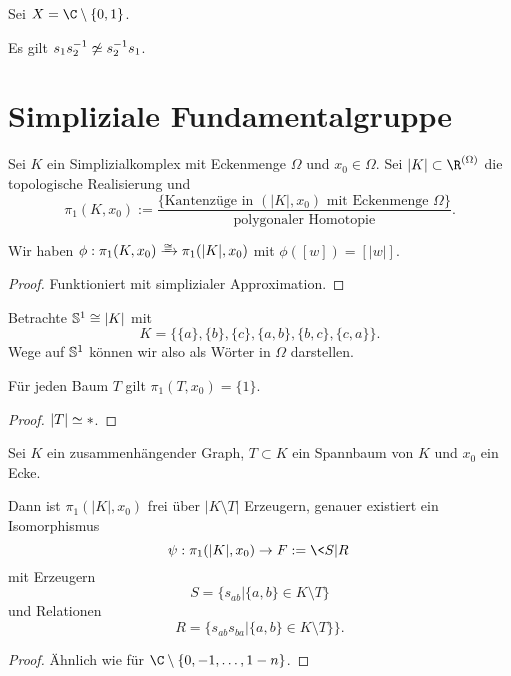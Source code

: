 \begin{ex}
	Sei $X = \C \setminus \{0, 1\}$.

	Es gilt $s_1s_2^{-1} \not\homotopic s_2^{-1} s_1$.
\end{ex}


\section{Simpliziale Fundamentalgruppe}


\begin{df}
	Sei $K$ ein Simplizialkomplex mit Eckenmenge $\Omega$ und $x_0 \in \Omega$.
	Sei $|K| \subset \R^{(\Omega)}$ die topologische Realisierung und
	\[
		\pi_1(K, x_0) := \dfrac{ \{ \text{Kantenzüge in $(|K|, x_0)$ mit Eckenmenge $\Omega$} \} }
		{ \text{polygonaler Homotopie} }.
	\]
\end{df}

\begin{st}
	Wir haben $\phi: \pi_1(K, x_0) \isomorphicto \pi_1(|K|, x_0)$ mit $\phi([w]) = [|w|]$.
	\begin{proof}
		Funktioniert mit simplizialer Approximation.
	\end{proof}
\end{st}

\begin{ex}
	Betrachte $\S^1 \homeomorphic |K|$ mit
	\[
		K = \Big\{ \{a\}, \{b\}, \{c\}, \{a, b\}, \{b, c\}, \{c, a\} \Big\}.
	\]
	Wege auf $\S^1$ können wir also als Wörter in $\Omega$ darstellen.
\end{ex}

\begin{st}
	Für jeden Baum $T$ gilt $\pi_1(T, x_0) = \{1\}$.
	\begin{proof}
		$|T| \homotopic *$.
	\end{proof}
\end{st}

\begin{st}
	Sei $K$ ein zusammenhängender Graph, $T \subset K$ ein Spannbaum von $K$ und $x_0$ ein Ecke.

	Dann ist $\pi_1(|K|, x_0)$ frei über $|K \setminus T|$ Erzeugern, genauer existiert ein Isomorphismus
	\[
		\psi: \pi_1(|K|, x_0) \to F := \< S | R \>
	\]
	mit Erzeugern
	\[
		S = \{ s_{ab} | \{a,b\} \in K \setminus T \}
	\]
	und Relationen
	\[
		R = \big\{ s_{ab} s_{ba} | \{a,b\} \in K \setminus T \} \big\}.
	\]
	\begin{proof}
		Ähnlich wie für $\C \setminus \{0, -1, \dotsc, 1-n \}$.
	\end{proof}
\end{st}





